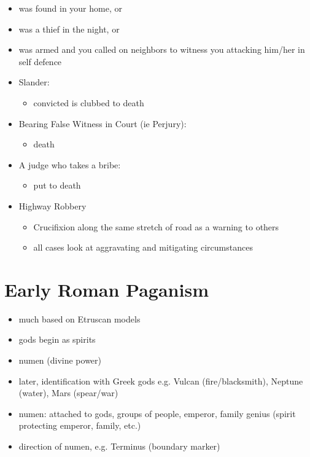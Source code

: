 \documentclass[12pt, twoside]{article}
\begin{document}
\begin{itemize}
\item was found in your home, or
\item was a thief in the night, or
\item was armed and you called on neighbors to witness you attacking him/her in self defence
\item Slander:
	\begin{itemize}
	\item convicted is clubbed to death
	\end{itemize}
\item Bearing False Witness in Court (ie Perjury):
	\begin{itemize}
	\item death
	\end{itemize}
\item A judge who takes a bribe:
	\begin{itemize}
	\item put to death
	\end{itemize}
\item Highway Robbery
	\begin{itemize}
	\item Crucifixion along the same stretch of road as a warning to others
	\item all cases look at aggravating and mitigating circumstances
	\end{itemize}
\end{itemize}

\section{Early Roman Paganism}
\begin{itemize}
\item much based on Etruscan models
\item gods begin as spirits
\item numen (divine power)
\item later, identification with Greek gods e.g. Vulcan (fire/blacksmith), Neptune (water), Mars (spear/war)
\item numen: attached to gods, groups of people, emperor, family genius (spirit protecting emperor, family, etc.)
\item direction of numen, e.g. Terminus (boundary marker)
\end{itemize}
\end{document}
